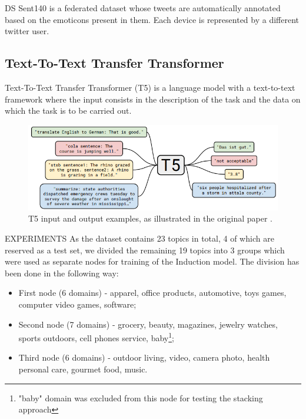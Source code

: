 DS
Sent140 \cite{caldas2019leaf} is a federated dataset whose tweets are automatically annotated based on the emoticons present in them. Each device is represented by a different twitter user.




            \subsection{Text-To-Text Transfer Transformer}
            Text-To-Text Transfer Transformer (T5) \cite{t5} is a language model with a text-to-text framework where the input consists in the description of the task and the data on which the task is to be carried out.
            
            \begin{figure}[h]
            \begin{center}
            \includegraphics[width=\textwidth]{pics/T5.png}
            \caption{T5 input and output examples, as illustrated in the original paper \cite{t5}.}
            \label{fig:user}
            \end{center}
            \end{figure}
          
EXPERIMENTS
As the dataset contains 23 topics in total, 4 of which are reserved as a test set, we divided the remaining 19 topics into 3 groups which were used as separate nodes for training of the Induction model. The division has been done in the following way:
    \begin{itemize}
        \item First node (6 domains) - apparel, office products, automotive, toys games, computer video games, software;
        \item Second node (7 domains) - grocery, beauty, magazines, jewelry watches, sports outdoors, cell phones service, baby\footnote{"baby" domain was excluded from this node for testing the stacking approach};
        \item Third node (6 domains) - outdoor living, video, camera photo, health personal care, gourmet food, music.
    \end{itemize}
